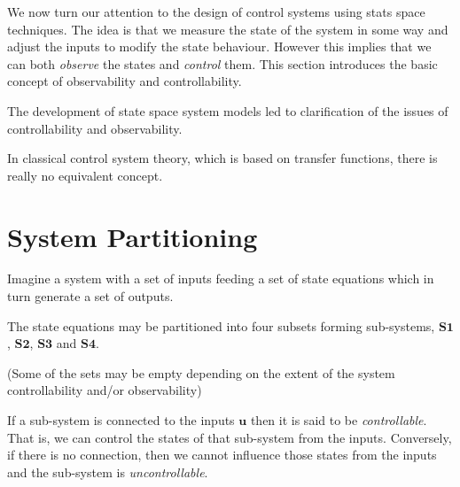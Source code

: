 \def\FileDate{10/02/01}
\def\FileVersion{1.0}

We now turn our attention to the design of control systems using stats space techniques. The idea is that we measure the state of the system in some way and adjust the inputs to modify the state behaviour. However this implies that we can both \emph{observe} the states and \emph{control} them. This section introduces the basic concept of observability and controllability.

The development of state space system models led to clarification of the issues of controllability and observability.

In classical control system theory, which is based on transfer functions, there is really no equivalent concept.

\section{System Partitioning} %
\label{sec:system_partitioning}

Imagine a system with a set of inputs feeding a set of state equations which in turn generate a set of outputs.

The state equations may be partitioned into four subsets forming sub-systems, $\mathbf{S1}$, $\mathbf{S2}$, $\mathbf{S3}$ and $\mathbf{S4}$. 

(Some of the sets may be empty depending on the extent of the system controllability and/or observability)


\ifslidesonly
\begin{slide}
   
\end{slide}
\fi

If a sub-system is connected to the inputs $\mathbf{u}$ then it is said to be \emph{controllable}. That is, we can control the states of that sub-system from the inputs. Conversely, if there is no connection, then we cannot influence those states from the inputs and the sub-system is \emph{uncontrollable}.

